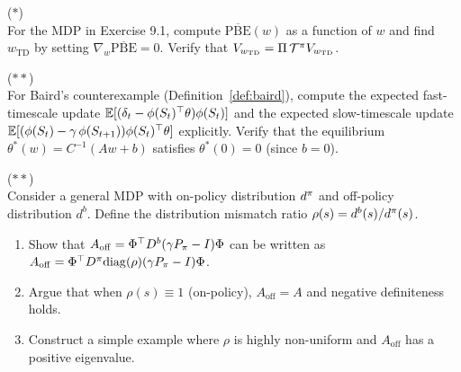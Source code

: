 \documentclass[11pt,a4paper]{article}
\begin{document}
\begin{exercise}
\textnormal{(\(*\))} \\
For the MDP in Exercise 9.1, compute $\overline{\mathrm{PBE}}(w)$
as a function of $w$ and find $w_{\mathrm{TD}}$ by setting
$\nabla_w \overline{\mathrm{PBE}} = 0$. Verify that
$V_{w_\mathrm{TD}} = \Pi\,\mathcal{T}^\pi V_{w_\mathrm{TD}}$.
\end{exercise}

\begin{exercise}
\textnormal{(\(**\))} \\
For Baird's counterexample (Definition~\ref{def:baird}), compute
the expected fast-timescale update $\mathbb{E}[(\delta_t
- \phi(S_t)^\top\theta)\phi(S_t)]$ and the expected slow-timescale
update $\mathbb{E}[(\phi(S_t) - \gamma\,\phi(S_{t+1}))
\phi(S_t)^\top\theta]$ explicitly. Verify that the equilibrium
$\theta^*(w) = C^{-1}(Aw + b)$ satisfies $\theta^*(0) = 0$ (since
$b = 0$).
\end{exercise}

\begin{exercise}
\textnormal{(\(**\))} \\
Consider a general MDP with on-policy distribution $d^\pi$ and
off-policy distribution $d^b$. Define the distribution mismatch ratio
$\rho(s) = d^b(s)/d^\pi(s)$.
\begin{enumerate}[nosep]
  \item[(a)] Show that
    $A_{\mathrm{off}} = \Phi^\top D^b(\gamma P_\pi - I)\Phi$
    can be written as
    $A_{\mathrm{off}} = \Phi^\top D^\pi \mathrm{diag}(\rho)
    (\gamma P_\pi - I)\Phi$.
  \item[(b)] Argue that when $\rho(s) \equiv 1$ (on-policy),
    $A_{\mathrm{off}} = A$ and negative definiteness holds.
  \item[(c)] Construct a simple example where $\rho$ is highly
    non-uniform and $A_{\mathrm{off}}$ has a positive eigenvalue.
\end{enumerate}
\end{exercise}
\end{document}
